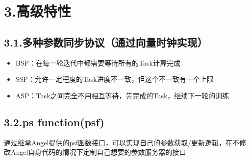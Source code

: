 \documentclass{article}
\begin{document}
\section{3.\hspace*{0.5em}高级特性}\label{section}%

\subsection{3.1.\hspace*{0.5em}多种参数同步协议（通过向量时钟实现）}\label{section}%

\begin{itemize}[noitemsep,topsep=\mdcompacttopsep]%

\item{}
BSP：在每一轮迭代中都需要等待所有的Task计算完成%

\item{}
SSP：允许一定程度的Task进度不一致，但这个不一致有一个上限%

\item{}ASP：Task之间完全不用相互等待，先完成的Task，继续下一轮的训练%
\end{itemize}%

\subsection{3.2.\hspace*{0.5em}ps function(psf)}\label{sec-ps-functionpsf}%

\noindent{}  \hspace*{1em}\hspace*{1em}通过继承Angel提供的psf函数接口，可以实现自己的参数获取/更新逻辑，在不修改Angel自身代码的情况下定制自己想要的参数服务器的接口%
\end{document}
